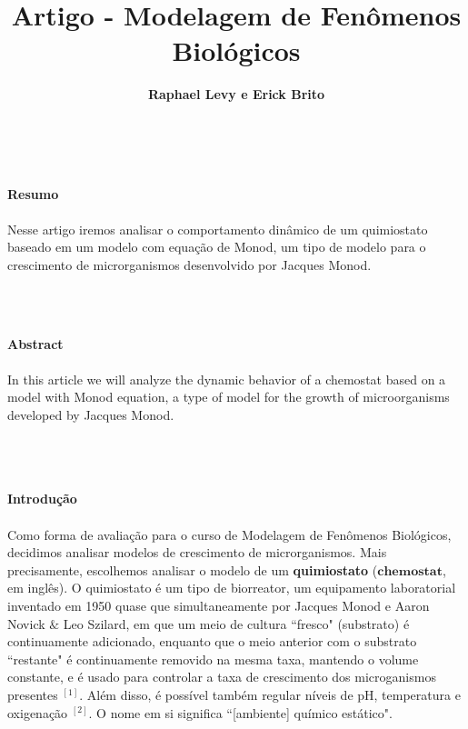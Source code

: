 \documentclass{article}
\title{\textbf{Artigo - Modelagem de Fenômenos Biológicos}}
\author{\textbf{Raphael Levy e Erick Brito}}
\date{}
\begin{document}
\maketitle
\\
\begin{center}
    \textbf{\Large{Resumo}}
    \\\\Nesse artigo iremos analisar o comportamento dinâmico de um quimiostato baseado em um modelo com equação de Monod, um tipo de modelo para o crescimento de microrganismos desenvolvido por Jacques Monod.
\end{center}
\\\\
\begin{center}
    \textbf{\Large{Abstract}}
    \\\\In this article we will analyze the dynamic behavior of a chemostat based on a model with Monod equation, a type of model for the growth of microorganisms developed by Jacques Monod. 
\end{center}
\\\\
\\
\textbf{\Large{Introdução}}
\\\\Como forma de avaliação para o curso de Modelagem de Fenômenos Biológicos, decidimos analisar modelos de crescimento de microrganismos. Mais precisamente, escolhemos analisar o modelo de um \textbf{quimiostato} ($\textbf{chemostat}$, em inglês). O quimiostato é um tipo de biorreator, um equipamento laboratorial inventado em 1950 quase que simultaneamente por Jacques Monod e Aaron Novick $\&$ Leo Szilard, em que um meio de cultura ``fresco" (substrato) é continuamente adicionado, enquanto que o meio anterior com o substrato ``restante" é continuamente removido na mesma taxa, mantendo o volume constante, e é usado para controlar a taxa de crescimento dos microganismos presentes $^{[1]}$. Além disso, é possível também regular níveis de pH, temperatura e oxigenação $^{[2]}$. O nome em si significa ``[ambiente] químico estático".
\end{document}
